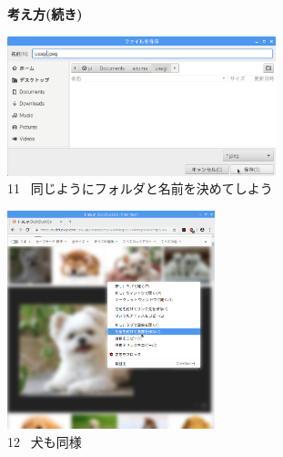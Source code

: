 \documentclass[a4paper,12pt]{jarticle}
\begin{document}
\begin{figure}[t]
  \textbf{考え方(続き)}



  \centering
  \begin{minipage}{\textwidth}
    \begin{minipage}{7.882cm}
      \includegraphics[width=7.811cm]{textbook-img103.png}\\
      11 \ 同じようにフォルダと名前を決めてしよう
    \end{minipage}
    \begin{minipage}{2.582cm}
    \end{minipage}
    \begin{minipage}{6.257cm}
      \includegraphics[width=6.041cm]{textbook-img092.png}\\
      12 \ 犬も同様
    \end{minipage}
  \end{minipage}


  \bigskip



\end{figure}
\end{document}

